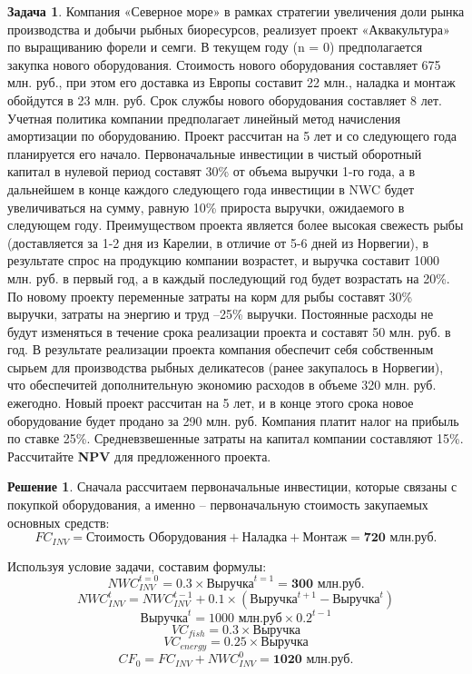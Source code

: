 \documentclass[a4paper, 14pt]{article}
\theoremstyle{plain} %
\theoremstyle{definition} %
\newtheorem*{solution}{Решение}
\newtheorem{problem}{Задача}[subsection]
\theoremstyle{remark} %
\begin{document}
\begin{problem}
    Компания  «Северное  море»  в  рамках  стратегии  увеличения  доли  рынка производства  и  добычи  рыбных  биоресурсов,  реализует  проект  «Аквакультура»  по выращиванию  форели  и  семги.  В  текущем  году  (n = 0)  предполагается  закупка  нового оборудования. Стоимость нового оборудования составляет 675 млн. руб., при этом его доставка из Европы составит 22 млн., наладка и монтаж обойдутся в 23 млн. руб. Срок службы нового оборудования составляет 8 лет. Учетная политика компании предполагает линейный метод начисления амортизации по оборудованию. Проект рассчитан на 5 лет и со  следующего  года  планируется  его  начало. Первоначальные  инвестиции  в  чистый оборотный капитал в нулевой период составят  30\% от объема выручки 1-го года, а в дальнейшем в конце каждого следующего года инвестиции в NWC будет увеличиваться на  сумму,  равную 10\%  прироста  выручки,  ожидаемого  в  следующем  году. Преимуществом проекта является более высокая свежесть рыбы (доставляется за 1-2 дня из  Карелии,  в  отличие  от  5-6  дней  из  Норвегии),  в  результате  спрос  на  продукцию компании  возрастет,  и  выручка  составит  1000  млн.  руб.  в  первый  год,  а  в  каждый последующий год будет возрастать на 20\%. По новому проекту переменные затраты на корм  для  рыбы  составят  30\%  выручки,  затраты  на  энергию  и  труд –25\%  выручки. Постоянные расходы не будут изменяться в течение срока реализации проекта и составят 50  млн.  руб.  в  год.  В  результате  реализации  проекта  компания  обеспечит  себя собственным  сырьем  для  производства  рыбных  деликатесов  (ранее  закупалось  в Норвегии), что обеспечитей дополнительную экономию расходов в объеме 320 млн. руб. ежегодно. Новый проект рассчитан на 5 лет, и в конце этого срока новое оборудование будет продано за 290 млн. руб. Компания платит налог на прибыль по ставке 25\%. Средневзвешенные затраты на капитал компании составляют 15\%. Рассчитайте \textbf{NPV} для предложенного проекта.
    \begin{solution}
		Сначала рассчитаем первоначальные инвестиции, которые связаны с покупкой оборудования, а именно – первоначальную стоимость закупаемых основных средств:
		\[FC_{INV} = \textit{Стоимость Оборудования} + \textit{Наладка} + \textit{Монтаж} = \textbf{720 млн.руб.} \]

		Используя условие задачи, составим формулы:
		\[NWC_{INV}^{t=0} = 0.3 \times \textit{Выручка}^{t=1} = \textbf{300 млн.руб.} \]
		\[NWC_{INV}^{t} = NWC_{INV}^{t-1} + 0.1\times(\textit{Выручка}^{t+1}-\textit{Выручка}^{t})\]
		\[\textit{Выручка}^{t} = \text{1000 млн.руб} \times 0.2^{t-1}\]
		\[VC_{fish} = 0.3 \times \textit{Выручка}\]
		\[VC_{energy} = 0.25 \times \textit{Выручка}\]
		\[CF_{0} = FC_{INV} + NWC_{INV}^{0} = \textbf{1020 млн.руб.}\]


\end{solution}
\end{problem}
\end{document}
